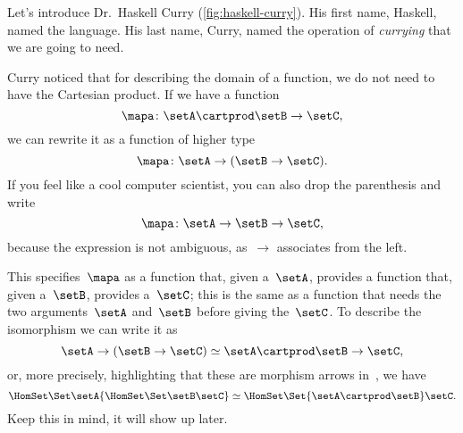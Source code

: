 Let's introduce Dr.~Haskell Curry (\cref{fig:haskell-curry}).
His first name,  Haskell, named the language.
His last name, Curry, named the operation of \emph{currying} that we are going to need.

Curry noticed that for describing the domain of a function, we do not need to have the Cartesian product.
If we have a function
\begin{equation}
	\label{eq:currying-1}
	\mapa \colon \setA \cartprod \setB \to \setC,
\end{equation}
we can rewrite it as a function of higher type
\begin{equation}
	\label{eq:currying-2}
	\mapa \colon \setA \to ( \setB \to \setC).
\end{equation}
If you feel like a cool computer scientist, you can also drop the parenthesis and write
\begin{equation}
	\label{eq:currying-3}
	\mapa \colon \setA \to \setB \to \setC,
\end{equation}
because the expression is not ambiguous, as~$\to$ associates from the left.


This specifies~$\mapa$ as a function that, given a~$\setA$, provides a function that, given a~$\setB$, provides a~$\setC$;
this is the same as a function that needs the two arguments~$\setA$ and~$\setB$ before giving the~$\setC$.
To describe the isomorphism we can write it as
\begin{equation}
	\label{eq:currying-iso-1}
	\setA \to ( \setB \to \setC) \simeq  \setA \cartprod \setB \to \setC,
\end{equation}
or, more precisely, highlighting that these are morphism arrows in~\Set, we have
\begin{equation}
	\label{eq:currying-iso-2}
	\HomSet\Set\setA{\HomSet\Set\setB\setC} \simeq \HomSet\Set{\setA \cartprod \setB}\setC.
\end{equation}
Keep this in mind, it will show up later.

